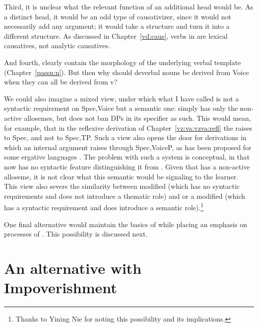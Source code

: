 \begin{exe}
\begin{xlist}
\begin{exe}
\begin{exe}
\begin{xlist}
\begin{exe}
\begin{exe}
\begin{exe}
\begin{exe}
\begin{exe}
\begin{xlist}
\begin{exe}
Third, it is unclear what the relevant function of an additional head would be. As a  distinct  head, it would be an odd type of causativizer, since it would not necessarily add any argument; it would take a  structure and turn it into a different  structure. As discussed in Chapter~\ref{vd:caus},  verbs in {\thif} are lexical causatives, not analytic causatives.

And fourth,  clearly contain the morphology of the underlying verbal template (Chapter~\ref{passn:n}). But then why should deverbal nouns be derived from Voice when they can all be derived from v?

We could also imagine a mixed view, under which what I have called {\vz} is not a syntactic requirement on Spec,Voice but a semantic one: {\vz} simply has only the non-active allosemes, but does not ban DPs in its specifier as such. This would mean, for example, that in the reflexive derivation of Chapter~\ref{vz:va:vzva:refl} the  raises to Spec,{\vz} and not to Spec,TP. Such a view also opens the door for derivations in which an internal argument raises through Spec,VoiceP, as has been proposed for some ergative languages \citep{deal19li}. The problem with such a system is conceptual, in that {\vz} now has no syntactic feature distinguishing it from . Given that  has a non-active alloseme, it is not clear what this semantic {\vz} would be signaling to the learner. This view also severs the similarity between modified {\vz} (which has no syntactic requirements and does not introduce a thematic role) and {\pz} or a modified {\pz} (which has a syntactic requirement and does introduce a semantic role).\footnote{Thanks to Yining Nie for noting this possibility and its implications.}

One final alternative would maintain the basics of  while placing an emphasis on processes of . This possibility is discussed next.

\section{An alternative with Impoverishment} \label{aas:jim}


\end{exe}
\end{xlist}
\end{exe}
\end{exe}
\end{exe}
\end{exe}
\end{exe}
\end{xlist}
\end{exe}
\end{exe}
\end{xlist}
\end{exe}
